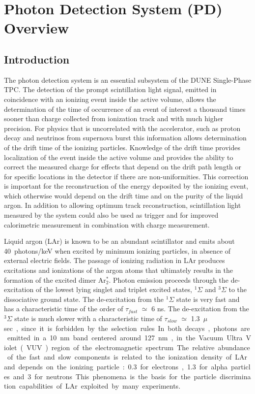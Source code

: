 \section{Photon Detection System (PD) Overview}
\label{sec:fdsp-pd-ov}

\subsection{Introduction}
\label{sec:fdsp-pd-intro}

The photon detection system is an essential subsystem of the DUNE Single-Phase TPC. The detection of the prompt scintillation light signal, emitted in coincidence with an ionizing event inside the active volume, allows the determination of the time of occurrence of an event of interest a thousand times sooner than charge collected from ionization track and with much higher precision. For physics that is uncorrelated with the accelerator, such as proton decay and neutrinos from supernova burst  this information allows determination of the drift time of the ionizing particles.
Knowledge of the drift time provides localization of the event inside the active volume and provides the ability to correct the measured charge for  effects that depend on the drift path length or for specific locations in the detector if there are non-uniformities.  This correction is important for the reconstruction of the energy deposited by the ionizing event, which otherwise would depend on the drift time and on the purity of the liquid argon. In addition to allowing optimum track reconstruction, scintillation light measured by the system could also be used as trigger and for improved calorimetric measurement in combination with charge measurement.

Liquid argon (LAr) is known to be an abundant scintillator and emits about \SI{40}{photons/keV} when excited  by minimum ionizing particles\cite{ref:lar-scint}, in absence of external electric fields. The passage of ionizing radiation in LAr produces excitations 
and ionizations of the argon atoms that ultimately results in the formation of the 
excited dimer Ar$^*_2$.  Photon emission proceeds through the de-excitation 
of the lowest lying singlet and triplet excited states, $^{1}\Sigma$ and 
$^{3}\Sigma$ to the dissociative ground state. The de-excitation from the 
$^{1}\Sigma$ state is very fast and has a characteristic time of the order of 
$\tau_{fast}$ $\simeq$ 6 ns. The de-excitation from the $^{3}\Sigma$ state is 
much slower with a characteristic time of $\tau_{slow}$ $\simeq$ \SI{1.3}{$\mu$sec}, 
since it is forbidden by the selection rules. 
In both decays, photons are emitted in a \SI{10}{nm} band centered around \SI{127}{nm}, in 
the Vacuum Ultra Violet (VUV) region of the electromagnetic spectrum.
The relative abundance of the  fast and slow components is related to the ionization density of LAr and 
depends on the ionizing particle: \num{0.3} for electrons, \num{1.3} for alpha 
particles and \num{3} for neutrons. This phenomena is the basis for the  
particle discrimination capabilities of LAr exploited by many 
experiments.

